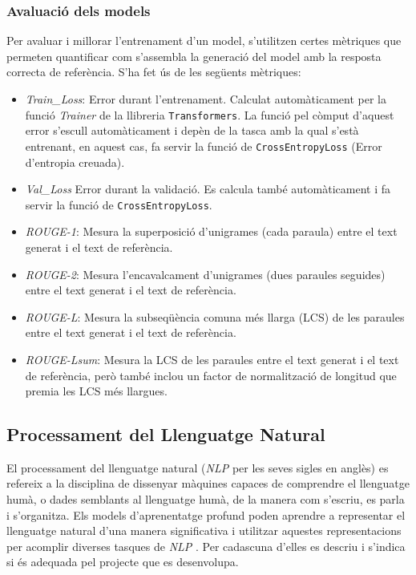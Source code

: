 \subsubsection{Avaluació dels models}
Per avaluar i millorar l'entrenament d'un model, s'utilitzen certes mètriques que permeten quantificar com s'assembla la generació del model amb la resposta correcta de referència. S'ha fet ús de les següents mètriques:
\begin{itemize}
    \item \textit{Train\_Loss}: Error durant l'entrenament. Calculat automàticament per la funció \textit{Trainer} de la llibreria \texttt{Transformers}. La funció pel còmput d'aquest error s'escull automàticament i depèn de la tasca amb la qual s'està entrenant, en aquest cas, fa servir la funció de \texttt{CrossEntropyLoss} (Error d'entropia creuada).
    \item \textit{Val\_Loss} Error durant la validació. Es calcula també automàticament i fa servir la funció de \texttt{CrossEntropyLoss}.
    \item \textit{ROUGE-1}: Mesura la superposició d'unigrames (cada paraula) entre el text generat i el text de referència.
    \item \textit{ROUGE-2}: Mesura l'encavalcament d'unigrames (dues paraules seguides) entre el text generat i el text de referència.
    \item \textit{ROUGE-L}: Mesura la subseqüència comuna més llarga (LCS) de les paraules entre el text generat i el text de referència.
    \item \textit{ROUGE-Lsum}: Mesura la LCS de les paraules entre el text generat i el text de referència, però també inclou un factor de normalització de longitud que premia les LCS més llargues.
\end{itemize}

\subsection{Processament del Llenguatge Natural} \label{ssec:definicio_NLP}
El processament del llenguatge natural (\textit{NLP} per les seves sigles en anglès) es refereix a la disciplina de dissenyar màquines capaces de comprendre el llenguatge humà, o dades semblants al llenguatge humà, de la manera com s'escriu, es parla i s'organitza. Els models d'aprenentatge profund poden aprendre a representar el llenguatge natural d'una manera significativa i utilitzar aquestes representacions per acomplir diverses tasques de \textit{NLP} \cite{Hugging-Face}. Per cadascuna d'elles es descriu i s'indica si és adequada pel projecte que es desenvolupa.

